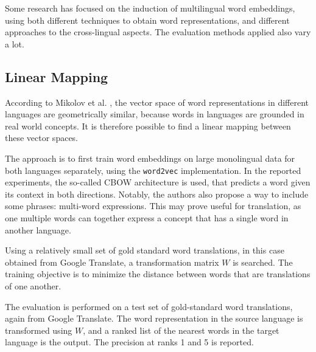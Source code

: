 Some research has focused on the induction of multilingual word embeddings, using both different techniques to obtain word representations, and different approaches to the cross-lingual aspects. The evaluation methods applied also vary a lot.


\subsection{Linear Mapping}\label{s:lin}

According to Mikolov et al. \cite{mikolov2013exploiting}, the vector space of word representations in different languages are geometrically similar, because words in languages are grounded in real world concepts.
It is therefore possible to find a linear mapping 
between these vector spaces.

The approach is to first train word embeddings on large monolingual data for both languages separately, using the \texttt{word2vec} implementation. In the reported experiments, the so-called CBOW architecture is used, that predicts a word given its context in both directions. 
Notably, the authors also propose a way to include some phrases: multi-word expressions. This may prove useful for translation, as one multiple words can together express a concept that has a single word in another language.

Using a relatively small set of gold standard word translations, in this case obtained from Google Translate, a transformation matrix $W$ is searched. The training objective is to minimize the distance between words that are translations of one another.

The evaluation is performed on a test set of gold-standard word translations, again from Google Translate. The word representation in the source language is transformed using $W$, and a ranked list of the nearest words in the target language is the output. The precision at ranks 1 and 5 is reported.


